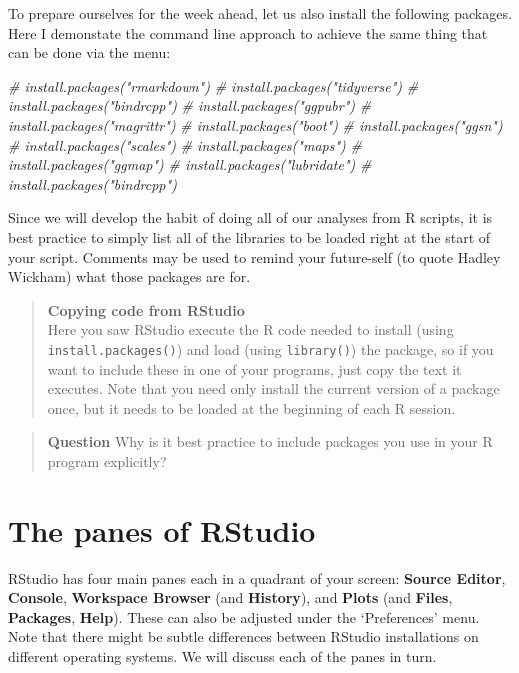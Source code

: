\documentclass[]{book}
\newenvironment{Shaded}{\begin{snugshade}}{\end{snugshade}}
\newcommand{\CommentTok}[1]{\textcolor[rgb]{0.56,0.35,0.01}{\textit{#1}}}
\theoremstyle{definition}
\theoremstyle{definition}
\theoremstyle{definition}
\theoremstyle{remark}
\begin{document}
To prepare ourselves for the week ahead, let us also install the
following packages. Here I demonstate the command line approach to
achieve the same thing that can be done via the menu:

\begin{Shaded}
\begin{Highlighting}[]
\CommentTok{# install.packages("rmarkdown")}
\CommentTok{# install.packages("tidyverse")}
\CommentTok{# install.packages("bindrcpp")}
\CommentTok{# install.packages("ggpubr")}
\CommentTok{# install.packages("magrittr")}
\CommentTok{# install.packages("boot")}
\CommentTok{# install.packages("ggsn")}
\CommentTok{# install.packages("scales")}
\CommentTok{# install.packages("maps")}
\CommentTok{# install.packages("ggmap")}
\CommentTok{# install.packages("lubridate")}
\CommentTok{# install.packages("bindrcpp")}
\end{Highlighting}
\end{Shaded}

Since we will develop the habit of doing all of our analyses from R
scripts, it is best practice to simply list all of the libraries to be
loaded right at the start of your script. Comments may be used to remind
your future-self (to quote Hadley Wickham) what those packages are for.

\begin{quote}
\textbf{Copying code from RStudio}\\
Here you saw RStudio execute the R code needed to install (using
\texttt{install.packages()}) and load (using \texttt{library()}) the
package, so if you want to include these in one of your programs, just
copy the text it executes. Note that you need only install the current
version of a package once, but it needs to be loaded at the beginning of
each R session.
\end{quote}

\begin{quote}
\textbf{Question} Why is it best practice to include packages you use in
your R program explicitly?
\end{quote}

\section{The panes of RStudio}\label{the-panes-of-rstudio}

RStudio has four main panes each in a quadrant of your screen:
\textbf{Source Editor}, \textbf{Console}, \textbf{Workspace Browser}
(and \textbf{History}), and \textbf{Plots} (and \textbf{Files},
\textbf{Packages}, \textbf{Help}). These can also be adjusted under the
`Preferences' menu. Note that there might be subtle differences between
RStudio installations on different operating systems. We will discuss
each of the panes in turn.
\end{document}
